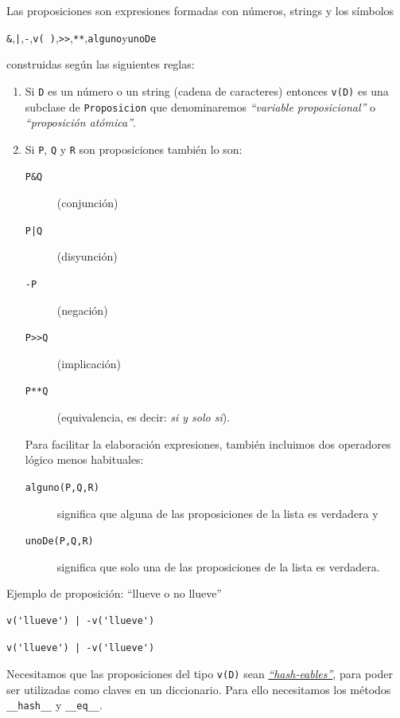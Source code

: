 \documentclass[10pt,a4paper]{report}
\begin{document}
Las proposiciones son expresiones formadas con números, strings y los símbolos
\begin{center}
\texttt{\&},\quad \texttt{|},\quad \texttt{-},\quad  \texttt{v( )},\quad \texttt{>{}>{}},\quad \texttt{**},\quad \texttt{alguno}\quad y\quad  \texttt{unoDe} 
\end{center}
construidas según las siguientes reglas:
\begin{enumerate}
\item Si \texttt{D} es un número o un string (cadena de caracteres) entonces \texttt{v(D)} es una
subclase de \texttt{Proposicion} que denominaremos \emph{``variable proposicional''} o \emph{``proposición atómica''}.
\item Si \texttt{P}, \texttt{Q} y \texttt{R} son proposiciones también lo son:
\begin{description}
\item[{\texttt{P\&Q}}] (conjunción)
\item[{\texttt{P|Q}}] (disyunción)
\item[{\texttt{-P}}] (negación)
\item[{\texttt{P>{}>{}Q}}] (implicación)
\item[{\texttt{P**Q}}] (equivalencia, es decir: \emph{si y solo si}).
\end{description}

Para facilitar la elaboración expresiones, también incluimos dos operadores lógico menos habituales: 
\begin{description}
\item[{\texttt{alguno(P,Q,R)}}] significa que alguna de las proposiciones de la lista es verdadera y
\item[{\texttt{unoDe(P,Q,R)}}] significa que solo una de las proposiciones de la lista es verdadera.
\end{description}
\end{enumerate}

Ejemplo de proposición: ``llueve o no llueve''
\begin{verbatim}
v('llueve') | -v('llueve')
\end{verbatim}

\label{}
\begin{verbatim}
v('llueve') | -v('llueve')
\end{verbatim}


Necesitamos que las proposiciones del tipo \texttt{v(D)} sean \href{https://docs.python.org/3/glossary.html\#term-hashable}{\emph{``hash-eables''}}, para poder ser utilizadas como claves en un diccionario. 
Para ello necesitamos los métodos \texttt{\_\_hash\_\_} y \texttt{\_\_eq\_\_}. 
\end{document}
